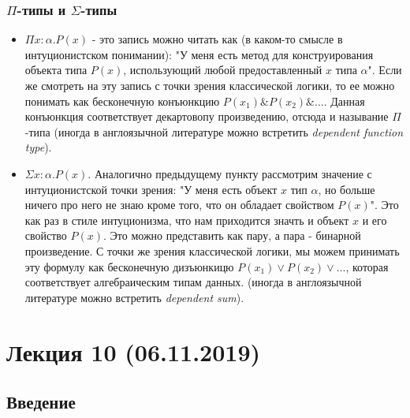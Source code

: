 \documentclass[12pt]{article}
\begin{document}
\subsubsection{$\Pi$-типы и $\Sigma$-типы}

\begin{itemize}
    \item $\Pi x : \alpha . P(x)$ - это запись можно читать как (в каком-то смысле в интуционистском понимании): "У меня есть метод для конструирования объекта типа $P(x)$, использующий любой предоставленный $x$ типа $\alpha$". Если же смотреть на эту запись с точки зрения классической логики, то ее можно понимать как бесконечную  конъюнкцию $P(x_1)\&P(x_2)\&...$. Данная конъюнкция соответствует декартовопу произведению, отсюда и называние $\Pi$-типа (иногда в англоязычной литературе можно встретить \textit{dependent function type}).
    \item $\Sigma x : \alpha . P(x)$. Аналогично предыдущему пункту рассмотрим значение с интуционистской точки зрения: "У меня есть объект $x$ тип $\alpha$, но больше ничего про него не знаю кроме того, что он обладает свойством $P(x)$". Это как раз в стиле интуционизма, что нам приходится значть и объект $x$ и его свойство $P(x)$. Это можно представить как пару, а пара - бинарной произведение. С точки же зрения классической логики, мы можем принимать эту формулу как бесконечную дизъюнкицю $P(x_1) \vee P(x_2)\vee ...$, которая соответствует алгебраическим типам данных. (иногда в англоязычной литературе можно встретить \textit{dependent sum}).
\end{itemize}

\section{Лекция 10 (06.11.2019)}

\subsection{Введение}
\end{document}
